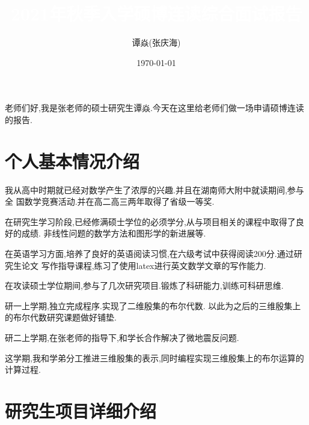 \documentclass[UTF8]{ctexbeamer}	%
\title{\textcolor{white}{2021年秋季入学硕博连读综合面试报告}}
\author{谭焱(张庆海)}
\institute{浙江大学数学科学学院}
\date{\today}
\theoremstyle{plain}
\theoremstyle{definition}
\newtheorem{emt}{}[section]
\theoremstyle{remark}
\numberwithin{equation}{section}
\begin{document}

\begin{frame}
 老师们好,我是张老师的硕士研究生谭焱.今天在这里给老师们做一场申请硕博连读的报告.
\end{frame}



\section{个人基本情况介绍}


        


\begin{frame}[fragile]
 我从高中时期就已经对数学产生了浓厚的兴趣.并且在湖南师大附中就读期间,参与全
 国数学竞赛活动.并在高二高三两年取得了省级一等奖.

 在研究生学习阶段,已经修满硕士学位的必须学分,从与项目相关的课程中取得了良好的成绩.
 非线性问题的数学方法和图形学的新进展等.

 在英语学习方面,培养了良好的英语阅读习惯,在六级考试中获得阅读200分.通过研究生论文
 写作指导课程,练习了使用latex进行英文数学文章的写作能力.
\end{frame}

\begin{frame}[fragile]
   在攻读硕士学位期间,参与了几次研究项目.锻炼了科研能力,训练可科研思维.

   研一上学期,独立完成程序.实现了二维殷集的布尔代数.
   以此为之后的三维殷集上的布尔代数研究课题做好铺垫.

   研二上学期,在张老师的指导下,和学长合作解决了微地震反问题.

   这学期,我和学弟分工推进三维殷集的表示,同时编程实现三维殷集上的布尔运算的计算过程.
\end{frame}

\section{研究生项目详细介绍}
\end{document}
